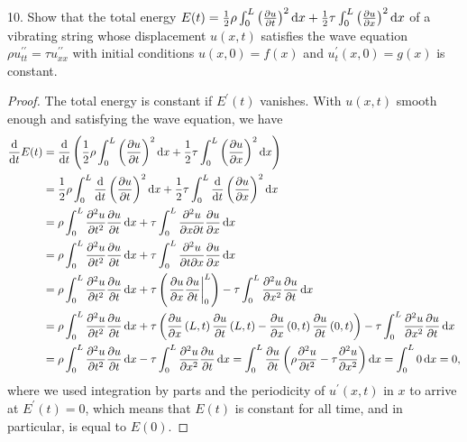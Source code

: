 \documentclass[11pt]{article}
\newcommand{\br}[1]{\left(#1\right)}
\newcommand{\dprime}{\prime\prime}
\begin{document}
10. Show that the total energy $E(t) = \frac{1}{2}\rho \int_0^L \br{\pdv{u}{t}}^2\dd{x} + \frac{1}{2}\tau \int_0^L \br{\pdv{u}{x}}^2\dd{x}$ of a vibrating string whose displacement $u(x,t)$ satisfies the wave equation $\rho u^{\dprime}_{tt} = \tau u^{\dprime}_{xx}$ with initial conditions $u(x,0) = f(x)$ and $u^{\prime}_t(x,0) = g(x)$ is constant.
\begin{proof}
  The total energy is constant if $E^{\prime}(t)$ vanishes. With $u(x,t)$ smooth enough and satisfying the wave equation, we have
  \begin{align*}
    \dv{t}E(t) &= \dv{t}\br{\frac{1}{2}\rho \int_0^L \br{\pdv{u}{t}}^2\dd{x} + \frac{1}{2}\tau \int_0^L \br{\pdv{u}{x}}^2\dd{x}}\\
    &= \frac{1}{2}\rho \int_0^L \dv{t}\br{\pdv{u}{t}}^2\dd{x} + \frac{1}{2}\tau \int_0^L \dv{t}\br{\pdv{u}{x}}^2\dd{x}\\
    &= \rho \int_0^L \pdv[2]{u}{t}\pdv{u}{t}\dd{x} + \tau \int_0^L \pdv[2]{u}{x}{t}\pdv{u}{x}\dd{x}\\
    &= \rho \int_0^L \pdv[2]{u}{t}\pdv{u}{t}\dd{x} + \tau \int_0^L \pdv[2]{u}{t}{x}\pdv{u}{x}\dd{x}\\
    &= \rho \int_0^L \pdv[2]{u}{t}\pdv{u}{t}\dd{x} + \tau\br{\eval{\pdv{u}{x}\pdv{u}{t}}_0^L} - \tau \int_0^L \pdv[2]{u}{x}\pdv{u}{t}\dd{x}\\
    &= \rho \int_0^L \pdv[2]{u}{t}\pdv{u}{t}\dd{x} + \tau\br{ \pdv{u}{x}\br{L,t} \pdv{u}{t}\br{L,t} - \pdv{u}{x}\br{0,t} \pdv{u}{t}\br{0,t} } - \tau \int_0^L \pdv[2]{u}{x}\pdv{u}{t}\dd{x}\\
    &= \rho \int_0^L \pdv[2]{u}{t}\pdv{u}{t}\dd{x} - \tau \int_0^L \pdv[2]{u}{x}\pdv{u}{t}\dd{x} = \int_0^L \pdv{u}{t}\br{\rho \pdv[2]{u}{t} - \tau \pdv[2]{u}{x}}\dd{x} = \int_0^L 0\dd{x} =0,
  \end{align*} where we used integration by parts and the periodicity of $u^{\prime}(x,t)$ in $x$ to arrive at $E^{\prime}(t) = 0$, which means that $E(t)$ is constant for all time, and in particular, is equal to $E(0)$.
\end{proof}
\end{document}

